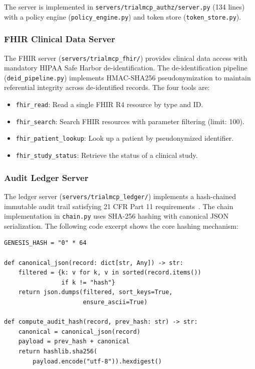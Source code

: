 \documentclass{article}
\begin{document}
The server is implemented in \texttt{servers/trialmcp\_authz/server.py} (134 lines) with a policy engine (\texttt{policy\_engine.py}) and token store (\texttt{token\_store.py}).

\subsubsection{FHIR Clinical Data Server}

The FHIR server (\texttt{servers/trialmcp\_fhir/}) provides clinical data access with mandatory HIPAA Safe Harbor de-identification. The de-identification pipeline (\texttt{deid\_pipeline.py}) implements HMAC-SHA256 pseudonymization to maintain referential integrity across de-identified records. The four tools are:

\begin{itemize}[leftmargin=*]
\item \texttt{fhir\_read}: Read a single FHIR R4 resource by type and ID.
\item \texttt{fhir\_search}: Search FHIR resources with parameter filtering (limit: 100).
\item \texttt{fhir\_patient\_lookup}: Look up a patient by pseudonymized identifier.
\item \texttt{fhir\_study\_status}: Retrieve the status of a clinical study.
\end{itemize}

\subsubsection{Audit Ledger Server}

The ledger server (\texttt{servers/trialmcp\_ledger/}) implements a hash-chained immutable audit trail satisfying 21 CFR Part 11 requirements~\cite{fda2003part11}. The chain implementation in \texttt{chain.py} uses SHA-256 hashing with canonical JSON serialization. The following code excerpt shows the core hashing mechanism:

\begin{lstlisting}[caption={Hash-chained audit record computation from \texttt{servers/trialmcp\_ledger/chain.py}.},label={lst:chain}]
GENESIS_HASH = "0" * 64

def canonical_json(record: dict[str, Any]) -> str:
    filtered = {k: v for k, v in sorted(record.items())
                if k != "hash"}
    return json.dumps(filtered, sort_keys=True,
                      ensure_ascii=True)

def compute_audit_hash(record, prev_hash: str) -> str:
    canonical = canonical_json(record)
    payload = prev_hash + canonical
    return hashlib.sha256(
        payload.encode("utf-8")).hexdigest()
\end{lstlisting}
\end{document}
